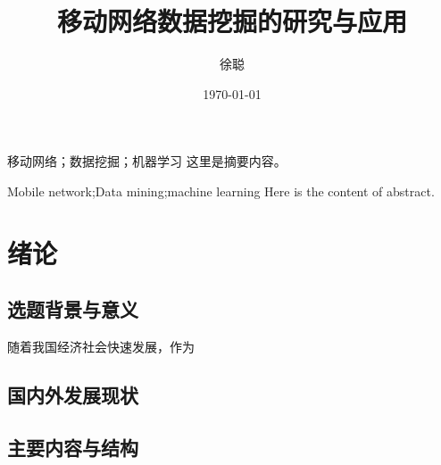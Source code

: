 \documentclass{HustGraduPaper}
\title{移动网络数据挖掘的研究与应用}
\author{徐聪}
\date{\today}
\begin{document}
    \maketitle
    \statement
    \clearpage

    \begin{cnabstract}{移动网络；数据挖掘；机器学习}
        这里是摘要内容。
    \end{cnabstract}
    \begin{enabstract}{Mobile network;Data mining;machine learning}
        Here is the content of abstract.
    \end{enabstract}

    \tableofcontents
    \clearpage

    \section{绪论}
    \subsection{选题背景与意义}
    随着我国经济社会快速发展，作为
    \subsection{国内外发展现状}
    \subsection{主要内容与结构}
    
    
\end{document}
